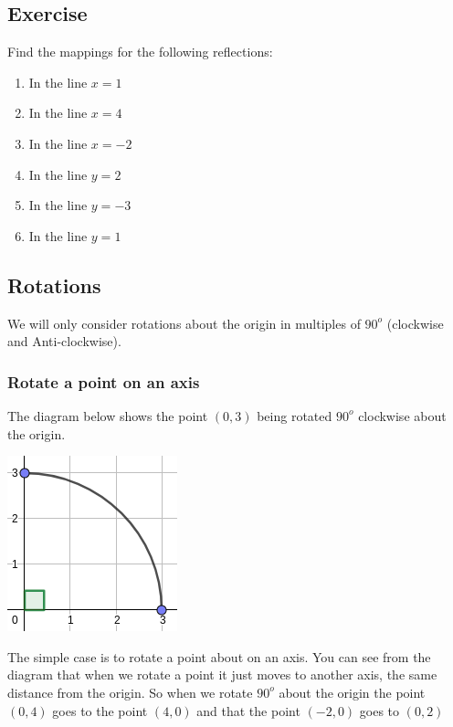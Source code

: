 \subsection{Exercise}
Find the mappings for the following reflections:
\begin{enumerate}
	\item In the line $x=1$
	\item In the line $x=4$
	\item In the line $x=-2$
	\item In the line $y=2$
	\item In the line $y=-3$
	\item In the line $y=1$
\end{enumerate}

\subsection{Rotations}
We will only consider rotations about the origin in multiples of $90^o$ (clockwise and Anti-clockwise).

\subsubsection{Rotate a point on an axis}
The diagram below shows the point $(0, 3)$ being rotated $90^o$ clockwise about the origin.

\bigskip

\includegraphics[scale=0.6]{./Images/Transformations/Rotations_axis.png}

\bigskip

The simple case is to rotate a point about on an axis.  You can see from the diagram that when we rotate a point it just moves to another axis, the same distance from the origin.  So when we rotate $90^o$ about the origin the point $(0, 4)$ goes to the point $(4,0)$ and that the point $(-2, 0)$ goes to $(0, 2)$

